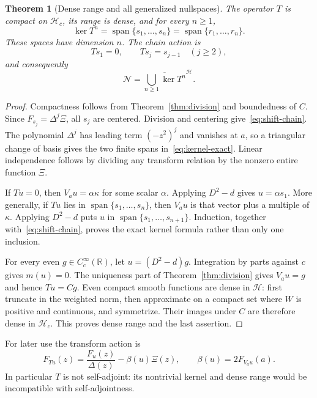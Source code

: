 \documentclass[11pt,a4paper]{article}
\numberwithin{equation}{section}
\newtheorem{theorem}{Theorem}[section]
\theoremstyle{definition}
\theoremstyle{remark}
\newcommand{\R}{\mathbb R}
\newcommand{\Hh}{\mathcal H}
\newcommand{\Nn}{\mathcal N}
\begin{document}
\begin{theorem}[Dense range and all generalized nullspaces]\label{thm:backward}
The operator $T$ is compact on $\Hh_c$, its range is dense, and for every $n\ge1$,
\begin{equation}\label{eq:kernel-exact}
 \ker T^n=\operatorname{span}\{s_1,\ldots,s_n\}
 =\operatorname{span}\{r_1,\ldots,r_n\}.
\end{equation}
These spaces have dimension $n$. The chain action is
\begin{equation}\label{eq:shift-chain}
 Ts_1=0,\qquad Ts_j=s_{j-1}\quad(j\ge2),
\end{equation}
and consequently
\begin{equation}\label{eq:N-generalized}
 \Nn=\overline{\bigcup_{n\ge1}\ker T^n}^{\Hh}.
\end{equation}
\end{theorem}
\begin{proof}
Compactness follows from Theorem~\ref{thm:division} and boundedness of $C$. Since $F_{s_j}=\Delta^j\Xi$, all $s_j$ are centered. Division and centering give~\eqref{eq:shift-chain}. The polynomial $\Delta^j$ has leading term $(-z^2)^j$ and vanishes at $a$, so a triangular change of basis gives the two finite spans in~\eqref{eq:kernel-exact}. Linear independence follows by dividing any transform relation by the nonzero entire function $\Xi$.

If $Tu=0$, then $V_au=\alpha\kappa$ for some scalar $\alpha$. Applying $D^2-d$ gives $u=\alpha s_1$. More generally, if $Tu$ lies in $\operatorname{span}\{s_1,\ldots,s_n\}$, then $V_au$ is that vector plus a multiple of $\kappa$. Applying $D^2-d$ puts $u$ in $\operatorname{span}\{s_1,\ldots,s_{n+1}\}$. Induction, together with~\eqref{eq:shift-chain}, proves the exact kernel formula rather than only one inclusion.

For every even $g\in C_c^\infty(\R)$, let $u=(D^2-d)g$. Integration by parts against $c$ gives $m(u)=0$. The uniqueness part of Theorem~\ref{thm:division} gives $V_au=g$ and hence $Tu=Cg$. Even compact smooth functions are dense in $\Hh$: first truncate in the weighted norm, then approximate on a compact set where $W$ is positive and continuous, and symmetrize. Their images under $C$ are therefore dense in $\Hh_c$. This proves dense range and the last assertion.
\end{proof}

For later use the transform action is
\begin{equation}\label{eq:T-transform}
 F_{Tu}(z)=\frac{F_u(z)}{\Delta(z)}-\beta(u)\Xi(z),\qquad
 \beta(u)=2F_{V_au}(a).
\end{equation}
In particular $T$ is not self-adjoint: its nontrivial kernel and dense range would be incompatible with self-adjointness.
\end{document}
